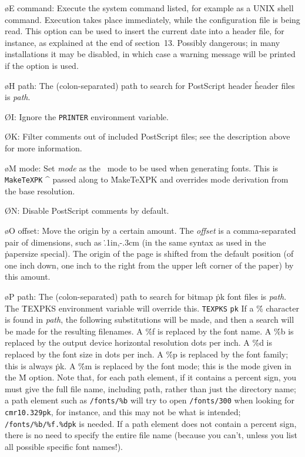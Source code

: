 {\o E command:
Execute the system command listed, for example as a UNIX shell command.
Execution takes place immediately, while the configuration file is
being read. This option can be used to insert the current date into a
header file, for instance, as explained at the end
of section~13.  Possibly dangerous; in many
installations it may be disabled, in which case a warning message will
be printed if the option is used.

\o H path:
The (colon-separated) path to search for PostScript header 
\^{header}
files is {\it path}.

\O I:
Ignore the {\tt PRINTER} environment variable.

\O K:
Filter comments out of included PostScript files; see the description
above for more information.

\o M mode: Set {\it mode}
as the \MF\ mode to be used when generating fonts.  This is
\^{{\tt MakeTeXPK}}
\^{{\MF}}
passed along to \.{MakeTeXPK} and overrides mode derivation from the
base resolution.

\O N:  Disable PostScript comments by default.

\o O offset:
Move the origin by a certain amount.  The {\it offset} is a comma-separated
pair of dimensions, such as \.{.1in,-.3cm} (in the same syntax as used in
the \.{papersize} special).   The origin of the page is shifted from the
default position (of one inch down, one inch to the right from the upper
left corner of the paper) by this amount.

\o P path:  The (colon-separated) path to search for bitmap \.{pk}
font files is
{\it path}.  The \.{TEXPKS} environment variable will override this.
\^{{\tt TEXPKS}}
\^{{\tt pk}}
If a \.{\%} character is found in {\it path},
the following substitutions will be made, and then a search will
be made for the resulting filenames.
A \.{\%f} is replaced by the font name.
A \.{\%b} is replaced by the output device horizontal resolution dots per inch.
A \.{\%d} is replaced by the font size in dots per inch.
A \.{\%p} is replaced by the font family; this is always \.{pk}.
A \.{\%m} is replaced by the font mode; this is the mode given
in the \.{M} option.
Note that, for each path element, if it contains a percent sign, you
must give the full file name, including path, rather than just the
directory name; a path element such as {\tt /fonts/\%b} will try to
open {\tt /fonts/300} when looking for {\tt cmr10.329pk}, for
instance, and this may not be what is intended; {\tt /fonts/\%b/\%f.\%dpk}
is needed.  If a path element does not contain a percent sign, there
is no need to specify the entire file name (because you can't, unless
you list all possible specific font names!).
  
}
